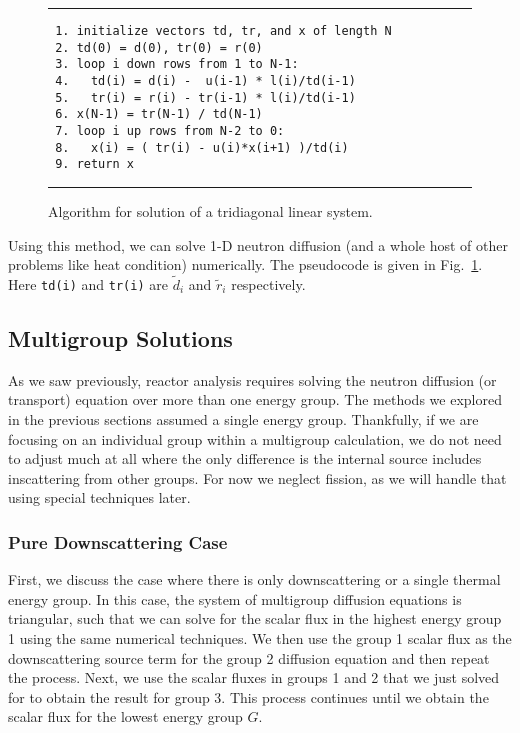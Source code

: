 \begin{figure}[tb!]
\begin{center}
\noindent \rule{\textwidth}{1pt}
\begin{verbatim}
 1. initialize vectors td, tr, and x of length N
 2. td(0) = d(0), tr(0) = r(0)
 3. loop i down rows from 1 to N-1:
 4.   td(i) = d(i) -  u(i-1) * l(i)/td(i-1)
 5.   tr(i) = r(i) - tr(i-1) * l(i)/td(i-1)
 6. x(N-1) = tr(N-1) / td(N-1)
 7. loop i up rows from N-2 to 0:
 8.   x(i) = ( tr(i) - u(i)*x(i+1) )/td(i)
 9. return x
\end{verbatim}
\rule{\textwidth}{1pt}
\caption{Algorithm for solution of a tridiagonal linear system.}
\label{Fig:linearAlgebra_tridiagonalSolveAlgorithm}
\end{center}
\end{figure}

 Using this method, we can solve 1-D neutron diffusion (and a whole host of other problems like heat condition) numerically. The pseudocode is given in Fig.~\ref{Fig:linearAlgebra_tridiagonalSolveAlgorithm}. Here \texttt{td(i)} and \texttt{tr(i)} are $\widetilde{d}_i$ and $\widetilde{r}_i$ respectively. 
 
\subsection{Multigroup Solutions}

As we saw previously, reactor analysis requires solving the neutron diffusion (or transport) equation over more than one energy group. The methods we explored in the previous sections assumed a single energy group. Thankfully, if we are focusing on an individual group within a multigroup calculation, we do not need to adjust much at all where the only difference is the internal source includes inscattering from other groups. For now we neglect fission, as we will handle that using special techniques later.

\subsubsection{Pure Downscattering Case}

First, we discuss the case where there is only downscattering or a single thermal energy group. In this case, the system of multigroup diffusion equations is triangular, such that we can solve for the scalar flux in the highest energy group 1 using the same numerical techniques. We then use the group 1 scalar flux as the downscattering source term for the group 2 diffusion equation and then repeat the process. Next, we use the scalar fluxes in groups 1 and 2 that we just solved for to obtain the result for group 3. This process continues until we obtain the scalar flux for the lowest energy group $G$. 

